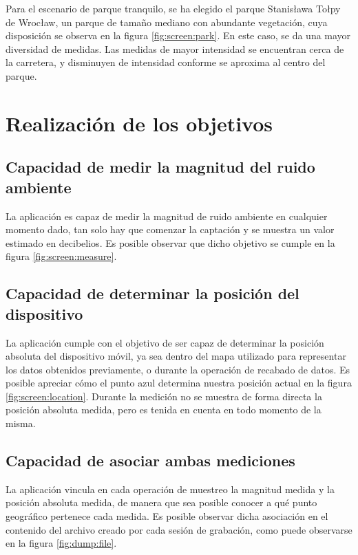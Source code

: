 \begin{figure}[H]
\begin{minipage}{0.45\textwidth}
\end{minipage}
\end{figure}
    Para el escenario de parque tranquilo, se ha elegido el parque Stanisława Tołpy de Wrocław, un parque de tamaño mediano con abundante vegetación, cuya disposición se observa en la figura \ref{fig:screen:park}. En este caso, se da una mayor diversidad de medidas. Las medidas de mayor intensidad se encuentran cerca de la carretera, y disminuyen de intensidad conforme se aproxima al centro del parque.


\section{Realización de los objetivos}

\subsection{Capacidad de medir la magnitud del ruido ambiente}
    La aplicación es capaz de medir la magnitud de ruido ambiente en cualquier momento dado, tan solo hay que comenzar la captación y se muestra un valor estimado en decibelios. Es posible observar que dicho objetivo se cumple en la figura \ref{fig:screen:measure}.

\subsection{Capacidad de determinar la posición del dispositivo}
    La aplicación cumple con el objetivo de ser capaz de determinar la posición absoluta del dispositivo móvil, ya sea dentro del mapa utilizado para representar los datos obtenidos previamente, o durante la operación de recabado de datos. Es posible apreciar cómo el punto azul determina nuestra posición actual en la figura \ref{fig:screen:location}. Durante la medición no se muestra de forma directa la posición absoluta medida, pero es tenida en cuenta en todo momento de la misma.


\subsection{Capacidad de asociar ambas mediciones}
    La aplicación vincula en cada operación de muestreo la magnitud medida y la posición absoluta medida, de manera que sea posible conocer a qué punto geográfico pertenece cada medida. Es posible observar dicha asociación en el contenido del archivo creado por cada sesión de grabación, como puede observarse en la figura \ref{fig:dump:file}.

